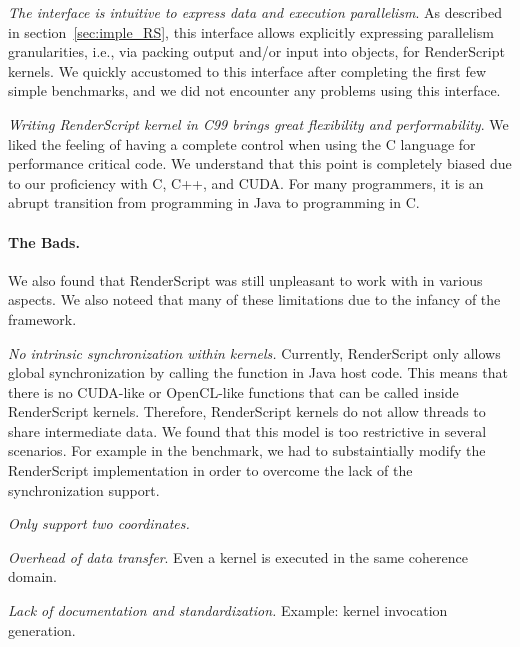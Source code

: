 \textit{The  interface is intuitive to express data and
execution parallelism}. As described in section~\ref{sec:imple_RS}, this
 interface allows explicitly expressing parallelism
granularities, i.e., via packing output and/or input into  objects,
for RenderScript kernels.  We quickly accustomed to this interface
after completing the first few simple benchmarks, and we did not encounter
any problems using this interface.

\textit{Writing RenderScript kernel in C99 brings great flexibility and
performability}. We liked the feeling of having a complete control when using
the C language for performance critical code. We understand that this point is
completely biased due to our proficiency with C, C++, and CUDA. For many
programmers, it is an abrupt transition from programming in Java to programming
in C.


\paragraph{The Bads.} We also found that RenderScript was still unpleasant to work
with in various aspects. We also noteed that many of these limitations due to the
infancy of the framework.

\textit{No intrinsic synchronization within kernels.} Currently, RenderScript
only allows global synchronization by calling the  function in
Java host code. This means that there is no CUDA-like  or
OpenCL-like  functions that can be called inside RenderScript
kernels. Therefore, RenderScript kernels do not allow threads to share
intermediate data. We found that this model is too restrictive in several
scenarios. For example in the  benchmark, we had to substaintially
modify the RenderScript implementation in order to overcome the lack of the
synchronization support.

\textit{Only support two coordinates.}

\textit{Overhead of data transfer}. Even a kernel is executed in the same
coherence domain.

\textit{Lack of documentation and standardization.} Example: kernel invocation generation.


